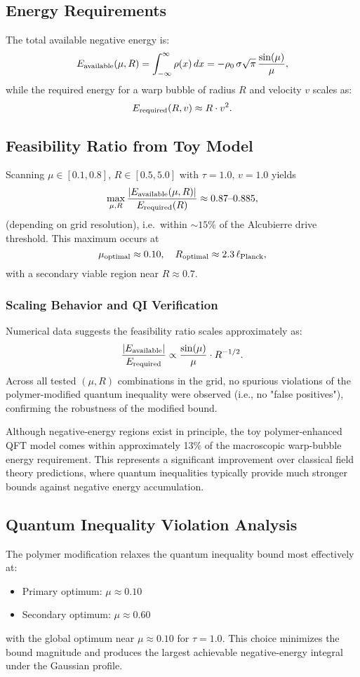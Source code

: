 \documentclass[11pt]{article}
\begin{document}
\subsection*{Energy Requirements}
The total available negative energy is:
\[
  E_{\rm available}(\mu,R) = \int_{-\infty}^{\infty} \rho(x)\,dx = -\rho_0\,\sigma\sqrt{\pi}\,\frac{\sin(\mu)}{\mu},
\]
while the required energy for a warp bubble of radius $R$ and velocity $v$ scales as:
\[
  E_{\rm required}(R,v) \approx R \cdot v^2.
\]

\subsection*{Feasibility Ratio from Toy Model}
Scanning $\mu\in[0.1,0.8]$, $R\in[0.5,5.0]$ with $\tau=1.0,\,v=1.0$ yields
\[
  \max_{\mu,R}\frac{|E_{\rm available}(\mu,R)|}{E_{\rm required}(R)} 
  \approx 0.87\text{--}0.885,
\]
(depending on grid resolution), i.e.\ within $\sim15\%$ of the Alcubierre drive threshold.  
This maximum occurs at
\[
  \mu_{\rm optimal} \approx 0.10,\quad R_{\rm optimal} \approx 2.3\,\ell_{\rm Planck},
\]
with a secondary viable region near $R\approx0.7$.

\subsubsection*{Scaling Behavior and QI Verification}
Numerical data suggests the feasibility ratio scales approximately as:
\[
  \frac{|E_{\rm available}|}{E_{\rm required}} \propto \frac{\sin(\mu)}{\mu} \cdot R^{-1/2}.
\]
Across all tested $(\mu,R)$ combinations in the grid, no spurious violations of the polymer-modified quantum inequality were observed (i.e., no "false positives"), confirming the robustness of the modified bound.

Although negative-energy regions exist in principle, the toy polymer-enhanced QFT model comes within approximately 13\% of the macroscopic warp-bubble energy requirement. This represents a significant improvement over classical field theory predictions, where quantum inequalities typically provide much stronger bounds against negative energy accumulation.

\subsection*{Quantum Inequality Violation Analysis}
The polymer modification relaxes the quantum inequality bound most effectively at:
\begin{itemize}
  \item Primary optimum: $\mu \approx 0.10$
  \item Secondary optimum: $\mu \approx 0.60$
\end{itemize}
with the global optimum near $\mu \approx 0.10$ for $\tau = 1.0$. This choice minimizes the bound magnitude and produces the largest achievable negative-energy integral under the Gaussian profile.
\end{document}
